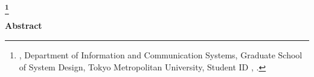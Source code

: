 \newpage
\begin{center}
 \renewcommand{\thefootnote}{\fnsymbol{footnote}}
 \Large\bfseries \etitle\footnote[1]
 {{\edoctitle}, Department of Information and Communication Systems,
 Graduate School of System Design,
 Tokyo Metropolitan University,
 {Student ID \studentnumber}, \edate.}
 \renewcommand{\thefootnote}{\arabic{footnote}}
\end{center}
\vspace*{1truemm}
\begin{center}
 \large\eauthor
\end{center}
\vspace*{2truemm}
\begin{center}
 {\bfseries Abstract}
\end{center}
\vspace*{2truemm}
\par
\eabstract

